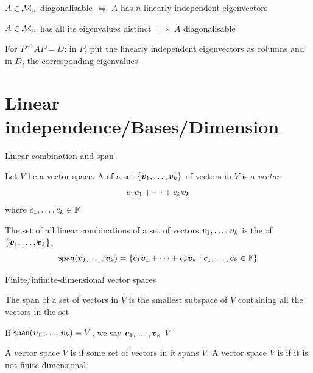 \documentclass[aspectratio=169]{beamer}\usepackage[]{graphicx}\usepackage[]{xcolor}
\begin{document}
\begin{frame}
\begin{importanttheorem}
$A\in\mathcal{M}_n$ diagonalisable $\iff$ $A$ has $n$ linearly independent eigenvectors
\end{importanttheorem}
\vfill
\begin{corollary}
$A\in\mathcal{M}_n$ has all its eigenvalues distinct $\implies$ $A$ diagonalisable
\end{corollary}
\vfill
For $P^{-1}AP=D$: in $P$, put the linearly independent eigenvectors as columns and in $D$, the corresponding eigenvalues
\end{frame}


\section{Linear independence/Bases/Dimension}

\begin{frame}{Linear combination and span}
	\begin{definition}
		Let $V$ be a vector space.
		A  of a set $\{\bm{v}_1,\ldots,\bm{v}_k\}$ of vectors in $V$ is a \emph{vector}
		\[
		c_1\bm{v}_1+\cdots+c_k\bm{v}_k
		\]
		where $c_1,\ldots,c_k\in\mathbb{F}$
	\end{definition}
	\vfill
	\begin{definition}[Span]
		The set of all linear combinations of a set of vectors $\bm{v}_1,\ldots,\bm{v}_k$ is the  of $\{\bm{v}_1,\ldots,\bm{v}_k\}$,
		\[
		\mathsf{span}(\bm{v}_1,\ldots,\bm{v}_k)=
		\left\{
		c_1\bm{v}_1+\cdots+c_k\bm{v}_k:c_1,\ldots,c_k\in\mathbb{F}
		\right\}
		\]
	\end{definition}
\end{frame}


\begin{frame}{Finite/infinite-dimensional vector spaces}
	\begin{theorem}
		The span of a set of vectors in $V$ is the smallest subspace of $V$ containing all the vectors in the set
	\end{theorem}
	\vfill
	\begin{definition}
		If $\mathsf{span}(\bm{v}_1,\ldots,\bm{v}_k)=V$, we say $\bm{v}_1,\ldots,\bm{v}_k$  $V$
	\end{definition}
	\vfill
	\begin{definition}
		A vector space $V$ is  if some set of vectors in it spans $V$.
		A vector space $V$ is  if it is not finite-dimensional
	\end{definition}
\end{frame}
\end{document}
